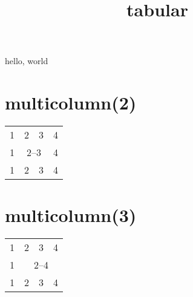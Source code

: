 \documentclass{amsart}
\title{tabular}
\begin{document}
\maketitle

hello, world

\section*{multicolumn(2)}

\begin{tabular}{|c|c|c|c|}
    1 & 2 & 3                    & 4\\
    1 & \multicolumn{2}{c|}{2--3} & 4\\
    1 & 2 & 3                    & 4
\end{tabular}

\section*{multicolumn(3)}

\begin{tabular}{|c|c|c|c|}
    1 & 2 & 3 & 4\\
    1 & \multicolumn{3}{c|}{2--4}\\
    1 & 2 & 3 & 4
\end{tabular}
\end{document}
